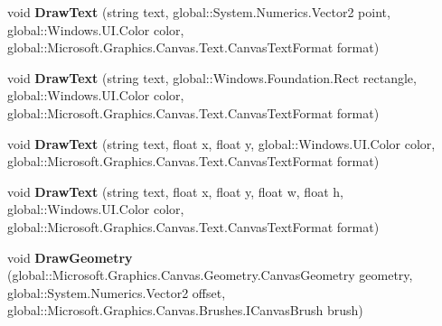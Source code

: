 \begin{DoxyCompactItemize}
\item 
\mbox{\label{interface_microsoft_1_1_graphics_1_1_canvas_1_1_i_canvas_drawing_session_a1fbae46edd2353fb50ee237788530985}} 
void {\bfseries Draw\+Text} (string text, global\+::\+System.\+Numerics.\+Vector2 point, global\+::\+Windows.\+U\+I.\+Color color, global\+::\+Microsoft.\+Graphics.\+Canvas.\+Text.\+Canvas\+Text\+Format format)
\item 
\mbox{\label{interface_microsoft_1_1_graphics_1_1_canvas_1_1_i_canvas_drawing_session_a1cf634350eda5e0895814a05a3e6ab4f}} 
void {\bfseries Draw\+Text} (string text, global\+::\+Windows.\+Foundation.\+Rect rectangle, global\+::\+Windows.\+U\+I.\+Color color, global\+::\+Microsoft.\+Graphics.\+Canvas.\+Text.\+Canvas\+Text\+Format format)
\item 
\mbox{\label{interface_microsoft_1_1_graphics_1_1_canvas_1_1_i_canvas_drawing_session_a97dfcfa11709602933556b5293ce5962}} 
void {\bfseries Draw\+Text} (string text, float x, float y, global\+::\+Windows.\+U\+I.\+Color color, global\+::\+Microsoft.\+Graphics.\+Canvas.\+Text.\+Canvas\+Text\+Format format)
\item 
\mbox{\label{interface_microsoft_1_1_graphics_1_1_canvas_1_1_i_canvas_drawing_session_af8be4ca90224b429475f9ada3770439f}} 
void {\bfseries Draw\+Text} (string text, float x, float y, float w, float h, global\+::\+Windows.\+U\+I.\+Color color, global\+::\+Microsoft.\+Graphics.\+Canvas.\+Text.\+Canvas\+Text\+Format format)
\item 
\mbox{\label{interface_microsoft_1_1_graphics_1_1_canvas_1_1_i_canvas_drawing_session_a9ca094c79f047b0753dc51a8286ac2ff}} 
void {\bfseries Draw\+Geometry} (global\+::\+Microsoft.\+Graphics.\+Canvas.\+Geometry.\+Canvas\+Geometry geometry, global\+::\+System.\+Numerics.\+Vector2 offset, global\+::\+Microsoft.\+Graphics.\+Canvas.\+Brushes.\+I\+Canvas\+Brush brush)
\item 
\mbox{\label{interface_microsoft_1_1_graphics_1_1_canvas_1_1_i_canvas_drawing_session_a014640571c93e977880498bdebb9e3f2}} 

\end{DoxyCompactItemize}
